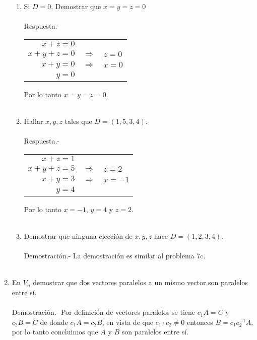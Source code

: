 \begin{enumerate}[\bfseries 1.]
\begin{enumerate}[\bfseries a)]
    \item Si $D=0$, Demostrar que $x=y=z=0$\\\\
	Respuesta.-\; 
	\begin{center}
	\begin{tabular}{rcl}
	    $x+z=0$&&\\
	    $x+y+z=0$&$\Longrightarrow$&$z=0$\\
	    $x+y=0$&$\Longrightarrow$&$x=0$\\
	    $y=0$&&\\
	\end{tabular}
	\end{center}
	Por lo tanto $x=y=z=0$.\\\\

    \item Hallar $x,y,z$ tales que $D=(1,5,3,4)$.\\\\
	Respuesta.-\;
	\begin{center}
	\begin{tabular}{rcl}
	 $x+z=1$&&\\
	 $x+y+z=5$&$\Longrightarrow$&$z=2$\\
	 $x+y=3$&$\Longrightarrow$&$x=-1$\\
	 $y=4$&&\\
	\end{tabular}
	\end{center}
	Por lo tanto $x=-1$, $y=4$ y $z=2$.\\\\

    \item Demostrar que ninguna elección de $x,y,z$ hace $D=(1,2,3,4)$.\\\\
	Demostración.-\; La demostración es similar al problema 7c.\\\\

\end{enumerate}

\item En $V_n$ demostrar que dos vectores paralelos a un mismo vector son paralelos entre sí.\\\\
    Demostración.-\; Por definición de vectores paralelos se tiene $c_1A=C$ y $c_2B=C$ de donde $c_1A=c_2B$, en vista de que $c_1\cdot c_2 \neq 0$ entonces $B=c_1c_2^{-1} A$, por lo tanto concluimos que $A$ y $B$ son paralelos entre sí.\\\\ 


\end{enumerate}
